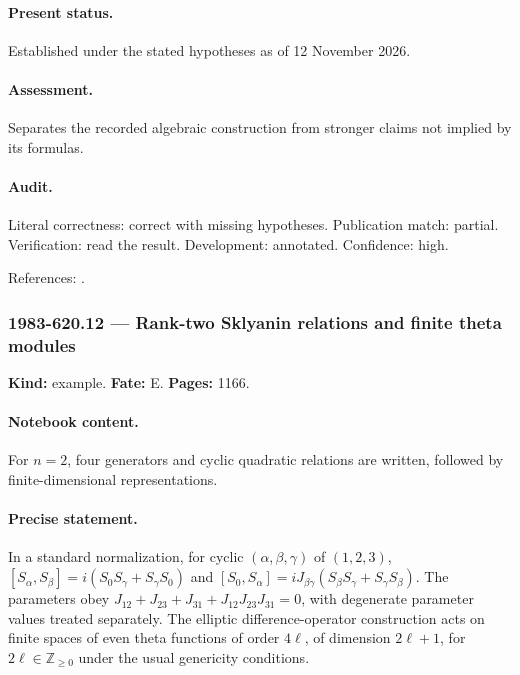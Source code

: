 \paragraph{Present status.} Established under the stated hypotheses as of 12 November 2026.

\paragraph{Assessment.} Separates the recorded algebraic construction from stronger claims not implied by its formulas.

\paragraph{Audit.} Literal correctness: correct with missing hypotheses. Publication match: partial. Verification: read the result. Development: annotated. Confidence: high.

\noindent References: \citep{sklyanin1982algebraic,cherednik1985finite}.\par

\subsubsection{1983-620.12 --- Rank-two Sklyanin relations and finite theta modules}

\label{item:1983-620.12}

\noindent\textbf{Kind:} example. \textbf{Fate:} E. \textbf{Pages:} 1166.\par

\paragraph{Notebook content.} For \(n=2\), four generators and cyclic quadratic relations are written, followed by finite-dimensional representations.

\paragraph{Precise statement.} In a standard normalization, for cyclic \((\alpha,\beta,\gamma)\) of \((1,2,3)\), \([S_\alpha,S_\beta]=i(S_0S_\gamma+S_\gamma S_0)\) and \([S_0,S_\alpha]=iJ_{\beta\gamma}(S_\beta S_\gamma+S_\gamma S_\beta)\). The parameters obey \(J_{12}+J_{23}+J_{31}+J_{12}J_{23}J_{31}=0\), with degenerate parameter values treated separately. The elliptic difference-operator construction acts on finite spaces of even theta functions of order \(4\ell\), of dimension \(2\ell+1\), for \(2\ell\in\mathbb Z_{\ge0}\) under the usual genericity conditions.

